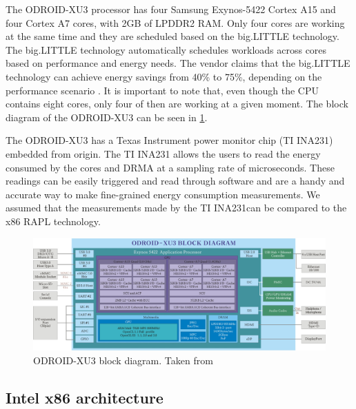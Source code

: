The ODROID-XU3 processor has four Samsung Exynos-5422 Cortex A15 and four Cortex A7 cores,
with 2GB of LPDDR2 RAM. Only four cores are working at the same time and they are 
scheduled based on the big.LITTLE technology. The big.LITTLE technology
\cite{biglittle} automatically schedules workloads across cores based on
performance and energy needs. The vendor claims that the big.LITTLE technology
can achieve energy savings from 40\% to 
75\%, depending on the performance scenario \cite{biglittle}.
It is important to note that, even though the CPU contains eight cores, only four of then are working at a
given moment. The block diagram of the ODROID-XU3 can be seen in 
\ref{fig:odroidxu3-diagram}.


The ODROID-XU3 has a Texas Instrument power monitor chip (TI INA231) embedded
from origin. The TI INA231 allows the users to read the energy consumed by the 
cores and DRMA at a 
sampling rate of microseconds. These readings can be easily triggered and read
through software and are a handy and accurate way to make fine-grained energy
consumption measurements. We assumed that the measurements made by the TI INA231can 
be compared to the x86 RAPL technology.



\vspace{15mm}

\begin{figure}[h!]
  \centering
    \includegraphics[width=\textwidth]{"img/odroidxu3-diagram"}
    \caption{ODROID-XU3 block diagram. Taken from \cite{ODROID_XU3}}
    \label{fig:odroidxu3-diagram}
\end{figure}

\vspace{15mm}



\subsection{Intel x86 architecture}


